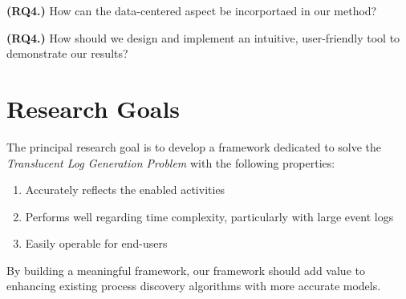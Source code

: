 \textbf{(RQ4.)} How can the data-centered aspect be incorportaed in our method?

\textbf{(RQ4.)} How should we design and implement an intuitive, user-friendly tool to demonstrate our results?



\section{Research Goals}
\begin{comment}
    In this section, you present your research goals.
A research goal is a concise statement that s.t., achieving the goal helps you in (partially) solve a research question.
Hence, the research questions and goals are often very related.
Furthermore, it should be obvious for the reader what goal answers what problem.

In the context of our previously mentioned questions, some example goals are:
\begin{itemize}
	\item Conduct a systematic literature review on noise patterns in real event data.
	\item Design a noise detection algorithm.
	\item Formalize the notion of incompleteness in an event log.
	\item ...
\end{itemize}
\end{comment}

The principal research goal is to develop a framework dedicated to solve the \emph{Translucent Log Generation Problem} with the following properties:

\begin{enumerate}
    \item Accurately reflects the enabled activities
    \item Performs well regarding time complexity, particularly with large event logs
    \item Easily operable for end-users
\end{enumerate}

By building a meaningful framework, our framework should add value to enhancing existing process discovery algorithms with more accurate models.

